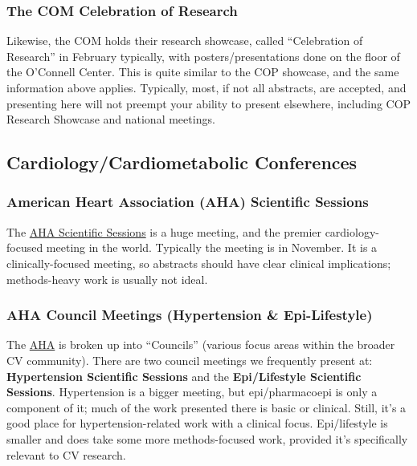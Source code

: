 \documentclass[
  letterpaper,
  DIV=11,
  numbers=noendperiod]{scrreprt}
\begin{document}
\hypertarget{the-com-celebration-of-research}{%
\subsubsection{The COM Celebration of
Research}\label{the-com-celebration-of-research}}

Likewise, the COM holds their research showcase, called ``Celebration of
Research'' in February typically, with posters/presentations done on the
floor of the O'Connell Center. This is quite similar to the COP
showcase, and the same information above applies. Typically, most, if
not all abstracts, are accepted, and presenting here will not preempt
your ability to present elsewhere, including COP Research Showcase and
national meetings.

\hypertarget{cardiologycardiometabolic-conferences}{%
\subsection{Cardiology/Cardiometabolic
Conferences}\label{cardiologycardiometabolic-conferences}}

\hypertarget{american-heart-association-aha-scientific-sessions}{%
\subsubsection{American Heart Association (AHA) Scientific
Sessions}\label{american-heart-association-aha-scientific-sessions}}

The
\href{https://professional.heart.org/en/meetings/scientific-sessions}{AHA
Scientific Sessions} is a huge meeting, and the premier
cardiology-focused meeting in the world. Typically the meeting is in
November. It is a clinically-focused meeting, so abstracts should have
clear clinical implications; methods-heavy work is usually not ideal.

\hypertarget{aha-council-meetings-hypertension-epi-lifestyle}{%
\subsubsection{AHA Council Meetings (Hypertension \&
Epi-Lifestyle)}\label{aha-council-meetings-hypertension-epi-lifestyle}}

The \href{https://www.heart.org/}{AHA} is broken up into ``Councils''
(various focus areas within the broader CV community). There are two
council meetings we frequently present at: \textbf{Hypertension
Scientific Sessions} and the \textbf{Epi/Lifestyle Scientific Sessions}.
Hypertension is a bigger meeting, but epi/pharmacoepi is only a
component of it; much of the work presented there is basic or clinical.
Still, it's a good place for hypertension-related work with a clinical
focus. Epi/lifestyle is smaller and does take some more methods-focused
work, provided it's specifically relevant to CV research.
\end{document}
